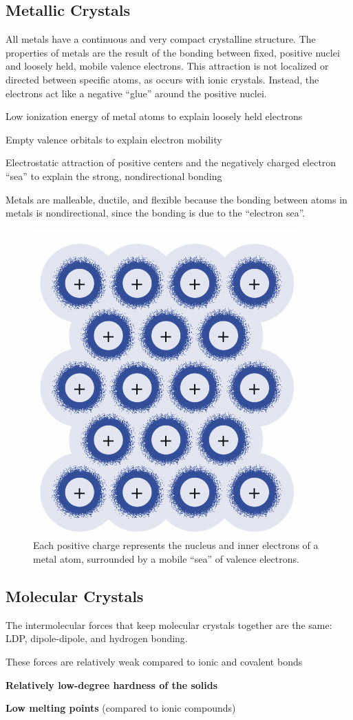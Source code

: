 \subsection{Metallic Crystals}
All metals have a continuous and very compact crystalline structure. The properties of metals are
the result of the bonding between fixed, positive nuclei and loosely held, mobile valence electrons.
This attraction is not localized or directed between specific atoms, as occurs with ionic crystals.
Instead, the electrons act like a negative ``glue'' around the positive nuclei. 

\begin{bulleted-list}
    \item Low ionization energy of metal atoms to explain loosely held electrons
    \item Empty valence orbitals to explain electron mobility
    \item Electrostatic attraction of positive centers and the negatively charged electron ``sea''
        to explain the strong, nondirectional bonding
\end{bulleted-list}

\begin{important}
    Metals are malleable, ductile, and flexible because the bonding between atoms in metals is
    nondirectional, since the bonding is due to the ``electron sea''.
\end{important}

\begin{figure}[ht!]
    \centering
    \includegraphics[width=0.4 \textwidth]{../figures/metallic-bonding.png}
    \caption{Each positive charge represents the nucleus and inner electrons of a metal atom,
    surrounded by a mobile ``sea'' of valence electrons.}
    \label{fig:metallic-bonding}
\end{figure}

\subsection{Molecular Crystals}
The intermolecular forces that keep molecular crystals together are the same: LDP, dipole-dipole,
and hydrogen bonding.
\begin{bulleted-list}
    \item These forces are relatively weak compared to ionic and covalent bonds
    \item \textbf{Relatively low-degree hardness of the solids}
    \item \textbf{Low melting points} (compared to ionic compounds)
\end{bulleted-list}

